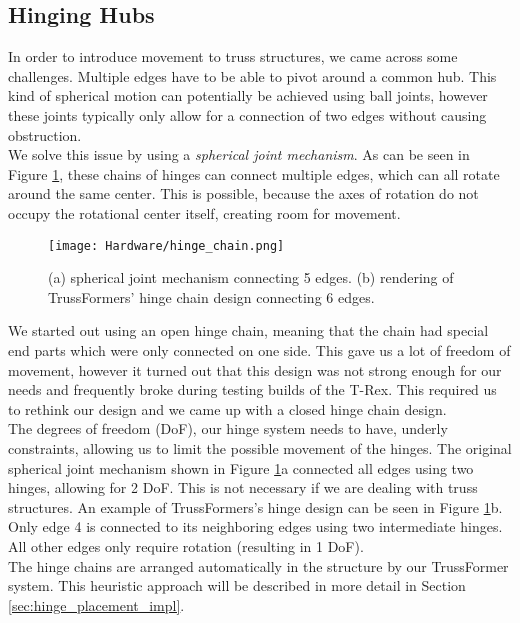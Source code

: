 \subsection{Hinging Hubs}
In order to introduce movement to truss structures, we came across some challenges. Multiple edges have to be able to pivot around a common hub. This kind of spherical motion can potentially be achieved using ball joints, however these joints typically only allow for a connection of two edges without causing obstruction.\\
We solve this issue by using a \textit{spherical joint mechanism}. As can be seen in Figure \ref{fig:hinge_chain}, these chains of hinges can connect multiple edges, which can all rotate around the same center. This is possible, because the axes of rotation do not occupy the rotational center itself, creating room for movement.\\
\begin{figure}[h!]
    \texttt{[image: Hardware/hinge\_chain.png]}
    \centering
    \caption{(a) spherical joint mechanism connecting 5 edges. (b) rendering of TrussFormers' hinge chain design connecting 6 edges.}
    \label{fig:hinge_chain}
\end{figure}
We started out using an open hinge chain, meaning that the chain had special end parts which were only connected on one side. This gave us a lot of freedom of movement, however it turned out that this design was not strong enough for our needs and frequently broke during testing builds of the T-Rex. This required us to rethink our design and we came up with a closed hinge chain design.\\
The degrees of freedom (DoF), our hinge system needs to have, underly constraints, allowing us to limit the possible movement of the hinges. The original spherical joint mechanism shown in Figure \ref{fig:hinge_chain}a connected all edges using two hinges, allowing for 2 DoF. This is not necessary if we are dealing with truss structures. An example of TrussFormers's hinge design can be seen in Figure \ref{fig:hinge_chain}b. Only edge 4 is connected to its neighboring edges using two intermediate hinges. All other edges only require rotation (resulting in 1 DoF).\\
The hinge chains are arranged automatically in the structure by our TrussFormer system. This heuristic approach will be described in more detail in Section \ref{sec:hinge_placement_impl}.

